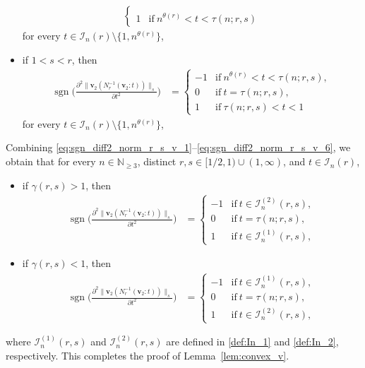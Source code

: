 \documentclass[conference, draftcls, onecolumn]{IEEEtran}
\theoremstyle{plain}
\newcommand{\bvec}[1]{\boldsymbol{#1}}
\newcommand{\sgn}{\operatorname{sgn}}
\newcommand{\lemref}[1]{Lemma~\ref{#1}}
\begin{document}
\begin{IEEEproof}[Proof of \lemref{lem:convex_v}]
\begin{itemize}
\begin{align}
\begin{cases}
\\
1
& \mathrm{if} \ n^{\theta( r )} < t < \tau(n; r, s)
\end{cases}
\label{eq:sgn_diff2_norm_r_s_v_5}
\end{align}
for every $t \in \mathcal{I}_{n}( r ) \setminus \{ 1, n^{\theta( r )} \}$,
\item
if $1 < s < r$, then
\begin{align}
\sgn \bigg( \frac{ \partial^{2} \| \bvec{v}_{2}( N_{r}^{-1}( \bvec{v}_{2} : t ) ) \|_{s} }{ \partial t^{2} } \bigg)
& =
\begin{cases}
-1
& \mathrm{if} \ n^{\theta( r )} < t < \tau(n; r, s) ,
\\
0
& \mathrm{if} \ t = \tau(n; r, s) ,
\\
1
& \mathrm{if} \ \tau(n; r, s) < t < 1
\end{cases}
\label{eq:sgn_diff2_norm_r_s_v_6}
\end{align}
for every $t \in \mathcal{I}_{n}( r ) \setminus \{ 1, n^{\theta( r )} \}$,
\end{itemize}
Combining \eqref{eq:sgn_diff2_norm_r_s_v_1}--\eqref{eq:sgn_diff2_norm_r_s_v_6}, we obtain that for every $n \in \mathbb{N}_{\ge 3}$, distinct $r, s \in [1/2, 1) \cup (1, \infty)$, and $t \in \mathcal{I}_{n}( r )$,
\begin{itemize}
\item
if $\gamma( r, s ) > 1$, then
\begin{align}
\sgn \bigg( \frac{ \partial^{2} \| \bvec{v}_{2}( N_{r}^{-1}( \bvec{v}_{2} : t ) ) \|_{s} }{ \partial t^{2} } \bigg)
& =
\begin{cases}
-1
& \mathrm{if} \ t \in \mathcal{I}_{n}^{(2)}( r, s ) ,
\\
0
& \mathrm{if} \ t = \tau(n; r, s) ,
\\
1
& \mathrm{if} \ t \in \mathcal{I}_{n}^{(1)}( r, s ) ,
\end{cases}
\end{align}
\item
if $\gamma( r, s ) < 1$, then
\begin{align}
\sgn \bigg( \frac{ \partial^{2} \| \bvec{v}_{2}( N_{r}^{-1}( \bvec{v}_{2} : t ) ) \|_{s} }{ \partial t^{2} } \bigg)
& =
\begin{cases}
-1
& \mathrm{if} \ t \in \mathcal{I}_{n}^{(1)}( r, s ) ,
\\
0
& \mathrm{if} \ t = \tau(n; r, s) ,
\\
1
& \mathrm{if} \ t \in \mathcal{I}_{n}^{(2)}( r, s ) ,
\end{cases}
\end{align}
\end{itemize}
where $\mathcal{I}_{n}^{(1)}( r, s )$ and $\mathcal{I}_{n}^{(2)}( r, s )$ are defined in \eqref{def:In_1} and \eqref{def:In_2}, respectively.
This completes the proof of \lemref{lem:convex_v}.
\end{IEEEproof}
\end{document}
